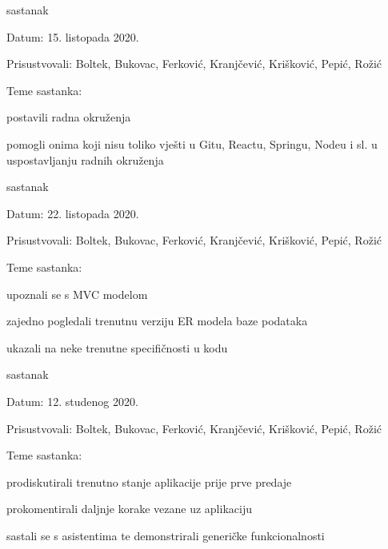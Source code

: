 \begin{packed_enum}
			\item sastanak
			\item[] \begin{packed_item}
				\item Datum: 15. listopada 2020.
				\item Prisustvovali: Boltek, Bukovac, Ferković, Kranjčević, Krišković, Pepić, Rožić
				\item Teme sastanka:
				\begin{packed_item}
					\item postavili radna okruženja
					\item pomogli onima koji nisu toliko vješti u Gitu, Reactu, Springu, Nodeu i sl. u uspostavljanju radnih okruženja
				\end{packed_item}
			\end{packed_item}
		
			\item sastanak
			\item[] \begin{packed_item}
				\item Datum: 22. listopada 2020.
				\item Prisustvovali: Boltek, Bukovac, Ferković, Kranjčević, Krišković, Pepić, Rožić
				\item Teme sastanka:
				\begin{packed_item}
					\item upoznali se s MVC modelom
					\item zajedno pogledali trenutnu verziju ER modela baze podataka
					\item ukazali na neke trenutne specifičnosti u kodu
				\end{packed_item}
			\end{packed_item}
		
			\item sastanak
			\item[] \begin{packed_item}
				\item Datum: 12. studenog 2020.
				\item Prisustvovali: Boltek, Bukovac, Ferković, Kranjčević, Krišković, Pepić, Rožić
				\item Teme sastanka:
				\begin{packed_item}
					\item prodiskutirali trenutno stanje aplikacije prije prve predaje
					\item prokomentirali daljnje korake vezane uz aplikaciju
					\item sastali se s asistentima te demonstrirali generičke funkcionalnosti
				\end{packed_item}
			\end{packed_item}
			
			
		\end{packed_enum}
		
